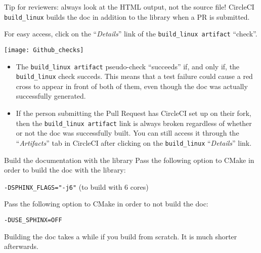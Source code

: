 \documentclass[8pt, handout]{beamer}
\begin{document}
\begin{frame}{Tip for reviewers: always look at the HTML output, not the source file!}
CircleCI \texttt{build\_linux} builds the doc in addition to the library when a PR is submitted.

For easy access, click on the ``\alert{\emph{Details}}'' link of the \texttt{build\_linux artifact} ``check''.

\texttt{[image: Github\_checks]}

\begin{itemize}
    \item The \texttt{build\_linux artifact} pseudo-check ``succeeds'' if, and only if, the \texttt{build\_linux} check succeds.
    This means that a test failure could cause a red cross to appear in front of both of them, even though the doc was actually successfully generated.
    \item If the person submitting the Pull Request has CircleCI set up on their fork, then the \texttt{build\_linux artifact} link is always broken regardless of whether or not the doc was successfully built. You can still access it through the ``\alert{\emph{Artifacts}}'' tab in CircleCI after clicking on the \texttt{build\_linux} ``\alert{\emph{Details}}'' link.
\end{itemize}
\end{frame}


\begin{frame}{Build the documentation with the library}
    Pass the following option to \alert{CMake} in order to build the doc with the library:
    
    \texttt{-DSPHINX\_FLAGS="-j6"} (to build with 6 cores)

    Pass the following option to \alert{CMake} in order to \alert{not} build the doc:
    
    \texttt{-DUSE\_SPHINX=OFF}

    Building the doc takes a while if you build from scratch. It is much shorter afterwards.
\end{frame}


\end{document}
